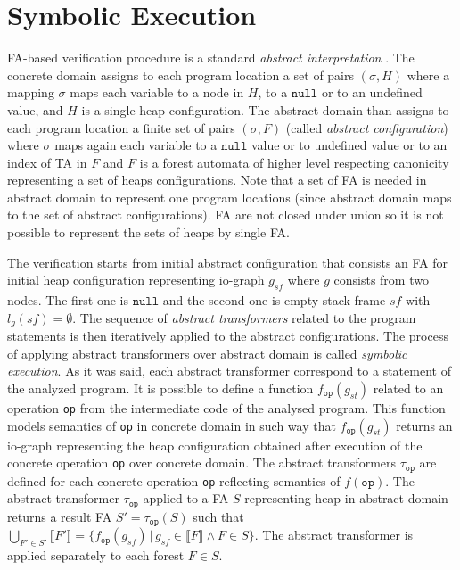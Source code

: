 \section{Symbolic Execution}
\label{sec:se}

FA-based verification procedure is a standard \emph{abstract interpretation} \cite{cousot:77}.
The concrete domain assigns to each program location a set of pairs
$(\sigma,H)$ where a mapping $\sigma$ maps each variable
to a node in $H$, to a $\texttt{null}$ or to an undefined value, and $H$ is a single heap configuration.
The abstract domain than assigns to each program location a finite set of pairs
$(\sigma, F)$ (called \emph{abstract configuration}) where $\sigma$ maps again each variable to a
$\texttt{null}$ value or to undefined value or to an index of TA in $F$ and $F$ is a forest automata
of higher level respecting canonicity representing a set of heaps configurations.
Note that a set of FA is needed in abstract domain to represent one program locations (since
abstract domain maps to the set of abstract configurations).
FA are not closed under union so it is not possible to represent the sets of heaps by single FA.

The verification starts from initial abstract configuration that consists an FA for initial heap configuration representing io-graph
$g_{\mathit{sf}}$ where $g$ consists from two nodes.
The first one is $\texttt{null}$ and the second one is empty stack frame $sf$ with $l_g(\mathit{sf}) = \emptyset$.
The sequence of \emph{abstract transformers} related to the program statements is then iteratively applied to the abstract configurations.
The process of applying abstract transformers over abstract domain is called \emph{symbolic execution}.
As it was said, each abstract transformer correspond to a statement of the analyzed program.
It is possible to define a function $f_{\texttt{op}}(g_{st})$ related to an operation \texttt{op} from the intermediate code of the analysed program.
This function models semantics of \texttt{op} in concrete domain in such way that $f_{\texttt{op}}(g_{\mathit{st}})$
returns an io-graph representing the heap configuration obtained after execution of the concrete operation \texttt{op} over concrete domain.
The abstract transformers $\tau_{\texttt{op}}$ are defined for each concrete operation \texttt{op} reflecting semantics of $f(\texttt{op})$.
The abstract transformer $\tau_{\texttt{op}}$ applied to a FA $S$ representing heap in abstract domain returns a result FA $S' = \tau_{\texttt{op}}(S)$
such that $\bigcup_{F' \in S'} \llbracket F' \rrbracket = \{ f_{\texttt{op}}(g_{sf}) \,|\, g_{sf} \in \llbracket F \rrbracket \wedge F \in S \}$.
The abstract transformer is applied separately to each forest $F \in S$.

